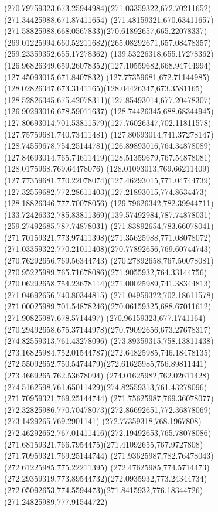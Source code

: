 {{	\curveto(270.79759323,673.25944984)(271.03359322,672.70211652)(271.34425988,671.87411654)
	\curveto(271.48159321,670.63411657)(271.58825988,668.0567833)(270.61892657,665.22078337)
	\curveto(269.01225994,660.52211682)(265.08292671,657.08478357)(259.23359352,655.17278362)
	\lineto(139.53226318,655.17278362)
	\curveto(126.96826349,659.26078352)(127.10559682,668.94744994)(127.45093015,671.8407832)
	\curveto(127.77359681,672.71144985)(128.02826347,673.3141165)(128.04426347,673.3581165)
	\curveto(128.52826345,675.42078311)(127.85493014,677.20478307)(126.90293016,678.59011637)
	\curveto(128.74426345,688.68344945)(127.80693014,701.53811579)(127.76026347,702.11811578)
	\lineto(127.75759681,740.73411481)
	\curveto(127.80693014,741.37278147)(128.74559678,754.25144781)(126.89893016,764.34878089)
	\curveto(127.84693014,765.74611419)(128.51359679,767.54878081)(128.0175968,769.64478076)
	\curveto(128.01093013,769.66211409)(127.77359681,770.22078074)(127.46293015,771.04744739)
	\curveto(127.32559682,772.28611403)(127.21893015,774.8634473)(128.18826346,777.70078056)
	\curveto(129.79626342,782.39944711)(133.72426332,785.83811369)(139.57492984,787.74878031)
	\lineto(259.27492685,787.74878031)
	\curveto(271.83892654,783.66078041)(271.70159321,773.97411398)(271.35625988,771.08078072)
	\curveto(271.03359322,770.21011408)(270.77892656,769.60744743)(270.76292656,769.56344743)
	\curveto(270.27892658,767.50078081)(270.95225989,765.71678086)(271.9055932,764.33144756)
	\curveto(270.06292658,754.23678114)(271.00025989,741.38344813)(271.04692656,740.80344815)
	\lineto(271.04959322,702.18611578)
	\curveto(271.00025989,701.54878246)(270.06159325,688.67011612)(271.90825987,678.5714497)
	\curveto(270.96159323,677.1741164)(270.29492658,675.37144978)(270.79092656,673.27678317)
	\moveto(274.82559313,761.43278096)
	\curveto(273.89359315,758.13811438)(273.16825984,752.01544787)(272.64825985,746.18478135)
	\curveto(272.55092652,750.5474479)(272.61625985,756.89811441)(273.4669265,762.53678094)
	\curveto(274.01625982,762.02611428)(274.5162598,761.65011429)(274.82559313,761.43278096)
	\moveto(271.70959321,769.25144744)
	\curveto(271.75625987,769.36078077)(272.32825986,770.70478073)(272.86692651,772.36878069)
	\lineto(273.1429265,769.2901141)
	\curveto(272.77359318,768.1967808)(272.46292652,767.01411416)(272.19492653,765.78078086)
	\curveto(271.68159321,766.7954475)(271.41092655,767.9727808)(271.70959321,769.25144744)
	\moveto(271.93625987,782.76478043)
	\lineto(272.61225985,775.22211395)
	\curveto(272.47625985,774.5714473)(272.29359319,773.89544732)(272.0935932,773.24344734)
	\curveto(272.05092653,774.5594473)(271.8415932,776.18344726)(271.24825989,777.91544722)
}}

